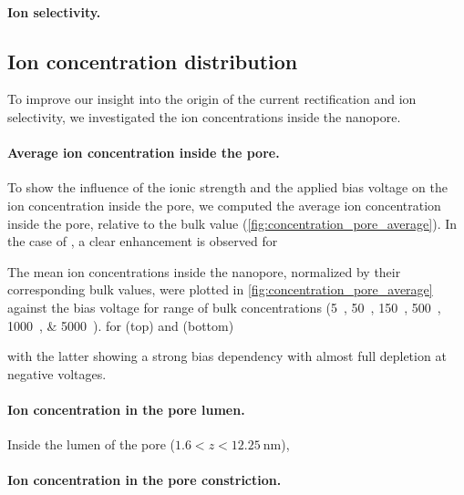 \documentclass[journal=ancac3, manuscript=article, etalmode=truncate,maxauthors=0]{achemso}
\begin{document}


\paragraph{Ion selectivity.}


\subsection{Ion concentration distribution}
To improve our insight into the origin of the current rectification and ion selectivity, we investigated the ion concentrations inside the nanopore.

\paragraph{Average ion concentration inside the pore.}
To show the influence of the ionic strength and the applied bias voltage on the ion concentration inside the pore,
we computed the average ion concentration inside the pore, relative to the bulk value (\cref{fig:concentration_pore_average}).
In the case of , a clear enhancement is observed for 

The mean ion concentrations inside the nanopore, normalized by their corresponding bulk values, were plotted in \cref{fig:concentration_pore_average} against the bias voltage for range of bulk concentrations (\SIlist{5;50;150;500;1000;5000}{\mM}).
for  (top) and  (bottom)





with the latter showing a strong bias dependency 
with almost full depletion at negative voltages.
\paragraph{Ion concentration in the pore lumen.}
Inside the lumen of the pore ($1.6<z<\SI{12.25}{\nm}$), 
\paragraph{Ion concentration in the pore constriction.}
\end{document}
